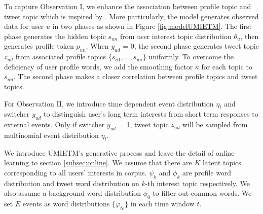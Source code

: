 \documentclass[runningheads,a4paper]{llncs}
\begin{document}
To capture Observation I, we enhance the association between profile topic and tweet topic which is inspired by \cite{blei2003modeling}. 
More particularly, the model generates observed data for user \(u\) in two phases as shown in Figure \ref{fig:modelUMIETM}. 
The first phase generates the hidden topic \(s_{un}\) from user interest topic distribution \(\theta_{u}\), then generates profile token \(p_{un}\). 
When \(y_{ud}\) = 0, the second phase generates tweet topic \(z_{ud}\) from associated profile topics \(\{s_{u1},..., s_{un}\}\) uniformly. 
To overcome the deficiency of user profile words, we add the smoothing factor \(\kappa\) for each topic to \(s_{un}\). 
The second phase makes a closer correlation between profile topics and tweet topics. 

For Observation II, we introduce time dependent event distribution \(\eta_t\) and switcher \(y_{ud}\) to distinguish user’s long term interests from short term responses to external events. 
Only if switcher \(y_{ud}\) = 1, tweet topic \(z_{ud}\) will be sampled from multinomial event distribution \(\eta_{t}\).

We introduce UMIETM's generative process and leave the detail of online learning to section \ref{subsec:online}.
We assume that there are \(K\) latent topics corresponding to all users' interests in corpus.
\(\psi_k\) and \(\phi_k\) are profile word distribution and tweet word distribution on \(k\)-th interest topic respectively.
We also assume a background word distribution \(\phi_0\) to filter out common words.
We set \(E\) events as word distributions \(\{\varphi_{te}\}\) in each time window \(t\).
\end{document}

